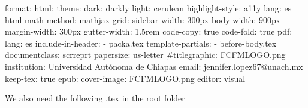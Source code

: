 \documentclass[
  letterpaper,
]{krantz}
\makeatletter
\newenvironment{Shaded}{\begin{snugshade}}{\end{snugshade}}
\newcommand{\AttributeTok}[1]{\textcolor[rgb]{0.40,0.45,0.13}{#1}}
\newcommand{\CharTok}[1]{\textcolor[rgb]{0.13,0.47,0.30}{#1}}
\newcommand{\CommentTok}[1]{\textcolor[rgb]{0.37,0.37,0.37}{#1}}
\newcommand{\FunctionTok}[1]{\textcolor[rgb]{0.28,0.35,0.67}{#1}}
\newcommand{\KeywordTok}[1]{\textcolor[rgb]{0.00,0.23,0.31}{#1}}
\newenvironment{kframe}{%
\medskip{}
\setlength{\fboxsep}{.8em}
 \def\at@end@of@kframe{}%
 \ifinner\ifhmode%
  \def\at@end@of@kframe{\end{minipage}}%
  \begin{minipage}{\columnwidth}%
 \fi\fi%
 \def\FrameCommand##1{\hskip\@totalleftmargin \hskip-\fboxsep
 \colorbox{shadecolor}{##1}\hskip-\fboxsep
     \hskip-\linewidth \hskip-\@totalleftmargin \hskip\columnwidth}%
 \MakeFramed {\advance\hsize-\width
   \@totalleftmargin\z@ \linewidth\hsize
   \@setminipage}}%
 {\par\unskip\endMakeFramed%
 \at@end@of@kframe}
\renewenvironment{Shaded}{\begin{kframe}}{\end{kframe}}
\theoremstyle{plain}
\theoremstyle{definition}
\theoremstyle{definition}
\theoremstyle{remark}
\makeatother
\begin{document}
\begin{codelisting}
\begin{Shaded}
\begin{Highlighting}[]
\FunctionTok{format}\KeywordTok{:}
\AttributeTok{  }\FunctionTok{html}\KeywordTok{:}
\AttributeTok{    }\FunctionTok{theme}\KeywordTok{:}
\AttributeTok{      }\FunctionTok{dark}\KeywordTok{:}\AttributeTok{ darkly}
\AttributeTok{      }\FunctionTok{light}\KeywordTok{:}\AttributeTok{ cerulean}
\AttributeTok{    }\FunctionTok{highlight{-}style}\KeywordTok{:}\AttributeTok{ a11y}
\AttributeTok{    }\FunctionTok{lang}\KeywordTok{:}\AttributeTok{ es}
\AttributeTok{    }\FunctionTok{html{-}math{-}method}\KeywordTok{:}\AttributeTok{ mathjax}
\AttributeTok{    }\FunctionTok{grid}\KeywordTok{:}
\AttributeTok{      }\FunctionTok{sidebar{-}width}\KeywordTok{:}\AttributeTok{ 300px}
\AttributeTok{      }\FunctionTok{body{-}width}\KeywordTok{:}\AttributeTok{ 900px}
\AttributeTok{      }\FunctionTok{margin{-}width}\KeywordTok{:}\AttributeTok{ 300px}
\AttributeTok{      }\FunctionTok{gutter{-}width}\KeywordTok{:}\AttributeTok{ 1.5rem}
\AttributeTok{    }\FunctionTok{code{-}copy}\KeywordTok{:}\AttributeTok{ }\CharTok{true}
\AttributeTok{    }\FunctionTok{code{-}fold}\KeywordTok{:}\AttributeTok{ }\CharTok{true}
\AttributeTok{  }\FunctionTok{pdf}\KeywordTok{:}
\AttributeTok{    }\FunctionTok{lang}\KeywordTok{:}\AttributeTok{ es}
\AttributeTok{    }\FunctionTok{include{-}in{-}header}\KeywordTok{:}
\AttributeTok{      }\KeywordTok{{-}}\AttributeTok{ packa.tex}
\AttributeTok{    }\FunctionTok{template{-}partials}\KeywordTok{:}
\AttributeTok{      }\KeywordTok{{-}}\AttributeTok{ before{-}body.tex}
\AttributeTok{    }\FunctionTok{documentclass}\KeywordTok{:}\AttributeTok{ scrreprt}
\AttributeTok{    }\FunctionTok{papersize}\KeywordTok{:}\AttributeTok{ us{-}letter}
\CommentTok{    \#titlegraphic: FCFMLOGO.png}
\AttributeTok{    }\FunctionTok{institution}\KeywordTok{:}\AttributeTok{ Universidad Autónoma de Chiapas}
\AttributeTok{    }\FunctionTok{email}\KeywordTok{:}\AttributeTok{ jennifer.lopez67@unach.mx}
\AttributeTok{    }\FunctionTok{keep{-}tex}\KeywordTok{:}\AttributeTok{ }\CharTok{true}
\AttributeTok{  }\FunctionTok{epub}\KeywordTok{:}
\AttributeTok{    }\FunctionTok{cover{-}image}\KeywordTok{:}\AttributeTok{ FCFMLOGO.png}
\FunctionTok{editor}\KeywordTok{:}\AttributeTok{ visual}
\end{Highlighting}
\end{Shaded}

\end{codelisting}

We also need the following .tex in the root folder
\end{document}
